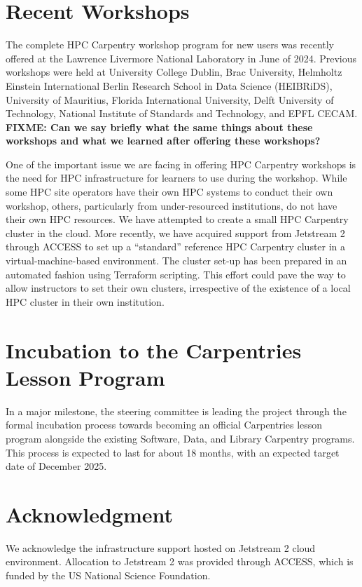 \section{Recent Workshops}

The complete HPC Carpentry workshop program for new users was recently offered at the Lawrence Livermore National Laboratory in June of 2024.
Previous workshops were held at University College Dublin, Brac University, Helmholtz Einstein International Berlin Research School in Data Science (HEIBRiDS), University of Mauritius, Florida International University, Delft University of Technology, National Institute of Standards and Technology, and EPFL CECAM.
\textbf{FIXME: Can we say briefly what the same things about these workshops and what we learned after offering these workshops?}

One of the important issue we are facing in offering HPC Carpentry workshops is the need for HPC infrastructure for learners to use during the workshop.
While some HPC site operators have their own HPC systems to conduct their own workshop, others, particularly from under-resourced institutions, do not have their own HPC resources.
We have attempted to create a small HPC Carpentry cluster in the cloud.
More recently, we have acquired support from Jetstream 2 through ACCESS to set up a ``standard'' reference HPC Carpentry cluster in a virtual-machine-based environment.
The cluster set-up has been prepared in an automated fashion using Terraform scripting.
This effort could pave the way to allow instructors to set their own clusters, irrespective of the existence of a local HPC cluster in their own institution.


\section{Incubation to the Carpentries Lesson Program}

In a major milestone, the steering committee is leading the project through the formal incubation process towards becoming an official Carpentries lesson program alongside the existing Software, Data, and Library Carpentry programs.
This process is expected to last for about 18 months, with an expected target date of December 2025.


\section{Acknowledgment}

We acknowledge the infrastructure support hosted on Jetstream 2 cloud environment. Allocation to Jetstream 2 was provided through ACCESS, which is funded by the US National Science Foundation.
